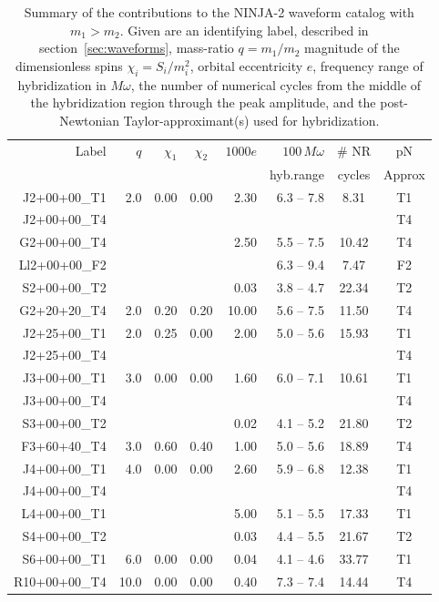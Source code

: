 %
\begin{table}
\caption[Submissions to NINJA-2]{
\label{tab:ninja2_submissions2}
Summary of the contributions to the NINJA-2 waveform catalog with $m_1
> m_2$.  Given are an identifying label, described in 
section~\ref{sec:waveforms}, 
mass-ratio $q=m_1/m_2$
magnitude of the dimensionless spins $\chi_i=S_i/m_i^2$, orbital
eccentricity $e$, frequency range of hybridization in $M\omega$, the
number of numerical cycles from the middle of the hybridization region
through the peak amplitude, and the post-Newtonian Taylor-approximant(s)
used for hybridization.
}
  \begin{tabular}{@{}rrrcrrcc}
      \hline
      Label & $q$ & $\chi_{1}$ & $\chi_{2}$ & $1000e$   & $100\,M\omega$ & \# NR 
& pN \\
      &    &     &            &            & hyb.range & cycles & Approx \\
      \hline
J2+00+00\_T1 & 2.0  &  0.00  &  0.00  &  2.30  &   6.3 -- 7.8  &  8.31  & T1\\
J2+00+00\_T4 & & & & & & & T4 \\
G2+00+00\_T4 &   &    &    &  2.50  &  5.5 -- 7.5  &  10.42  &  T4 \\
Ll2+00+00\_F2 &   &    &    &    &  6.3 -- 9.4  &  7.47  &  F2 \\
S2+00+00\_T2 &   &    &    &  0.03  &  3.8 -- 4.7  &  22.34  &  T2 \\
G2+20+20\_T4 & 2.0  &  0.20  &  0.20  &  10.00  &   5.6 -- 7.5  &  11.50  &  T4 
\\
J2+25+00\_T1 & 2.0  &  0.25  &  0.00  &  2.00  &   5.0 -- 5.6  &  15.93  & T1\\
J2+25+00\_T4 & & & & & & & T4 \\
J3+00+00\_T1 & 3.0  &  0.00  &  0.00  &  1.60  &   6.0 -- 7.1  &  10.61  & T1\\
J3+00+00\_T4 & & & & & & & T4 \\
S3+00+00\_T2 &   &    &    &  0.02  &  4.1 -- 5.2  &  21.80  &  T2 \\
F3+60+40\_T4 & 3.0  &  0.60  &  0.40  &  1.00  &   5.0 -- 5.6  &  18.89  &  T4 
\\
J4+00+00\_T1 & 4.0  &  0.00  &  0.00  &  2.60  &   5.9 -- 6.8  &  12.38  & T1\\
J4+00+00\_T4 & & & & & & & T4 \\
L4+00+00\_T1 &   &    &    &  5.00  &  5.1 -- 5.5  &  17.33  &  T1 \\
S4+00+00\_T2 &   &    &    &  0.03  &  4.4 -- 5.5  &  21.67  &  T2 \\
S6+00+00\_T1 & 6.0  &  0.00  &  0.00  &  0.04  &   4.1 -- 4.6  &  33.77  &  T1 
\\
R10+00+00\_T4 & 10.0  &  0.00  &  0.00  &  0.40  &   7.3 -- 7.4  &  14.44  &  T4 
\\
      \hline
    \end{tabular}
\end{table}

